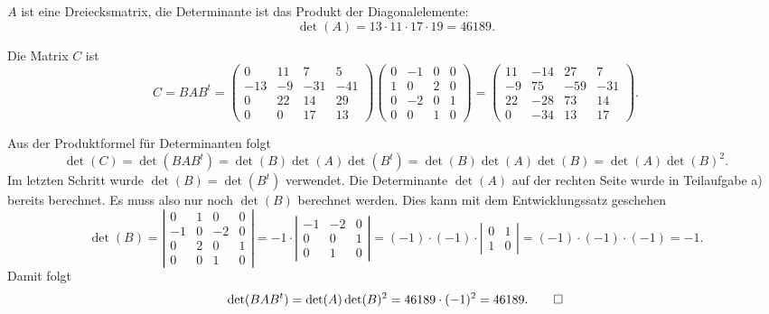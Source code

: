 \begin{loesung}
\begin{teilaufgaben}
\item $A$ ist eine Dreiecksmatrix, die Determinante ist das Produkt der
Diagonalelemente:
\[
\det(A) = 13\cdot 11 \cdot 17\cdot 19=46189.
\]
\item Die Matrix $C$ ist
\[
C
=
BAB^t
=
\begin{pmatrix}
  0& 11&  7&  5\\
-13& -9&-31&-41\\
  0& 22& 14& 29\\
  0&  0& 17& 13
\end{pmatrix}
\begin{pmatrix}
   0& -1&  0&  0\\
   1&  0&  2&  0\\
   0& -2&  0&  1\\
   0&  0&  1&  0
\end{pmatrix}
=
\begin{pmatrix}
   11& -14&  27&   7\\
   -9&  75& -59& -31\\
   22& -28&  73&  14\\
    0& -34&  13&  17
\end{pmatrix}.
\]
\item Aus der Produktformel für Determinanten folgt
\[
\det(C)
=
\det(BAB^t)
=
\det(B)\det(A)\det(B^t)
=
\det(B)\det(A)\det(B)
=
\det(A)\det(B)^2.
\]
Im letzten Schritt wurde $\det(B)=\det(B^t)$ verwendet.
Die Determinante $\det(A)$ auf der rechten Seite wurde in Teilaufgabe a)
bereits berechnet.
Es muss also nur noch $\det(B)$ berechnet werden.
Dies kann mit dem Entwicklungssatz geschehen
\[
\det(B)
=
\left|
\begin{matrix}
 0&  1&  0&  0\\
-1&  0& -2&  0\\
 0&  2&  0&  1\\
 0&  0&  1&  0
\end{matrix}\right|
=
-1\cdot
\left|\begin{matrix}
-1& -2&  0\\
 0&  0&  1\\
 0&  1&  0
\end{matrix}\right|
=
(-1)\cdot(-1)\cdot
\left|\begin{matrix}
0&  1\\
1&  0
\end{matrix}\right|
=(-1)\cdot(-1)\cdot(-1)=-1.
\]
Damit folgt
\[
\det(BAB^t)
=
\det(A)\det(B)^2
=
46189\cdot(-1)^2=46189.\qedhere
\]
\end{teilaufgaben}
\end{loesung}

